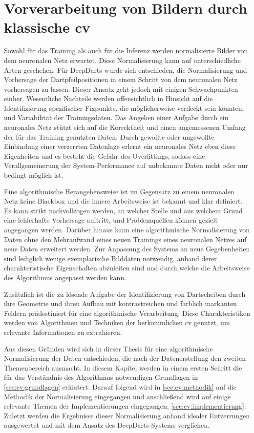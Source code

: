 
\chapter{Vorverarbeitung von Bildern durch klassische \acl{cv}}
\label{cha:cv}

Sowohl für das Training als auch für die Inferenz werden normalisierte Bilder von dem neuronalen Netz erwartet. Diese Normalisierung kann auf unterschiedliche Arten geschehen. Für DeepDarts wurde sich entschieden, die Normalisierung und Vorhersage der Dartpfeilpositionen in einem Schritt von dem neuronalen Netz vorhersagen zu lassen. Dieser Ansatz geht jedoch mit einigen Schwachpunkten einher. Wesentliche Nachteile werden offensichtlich in Hinsicht auf die Identifizierung spezifischer Fixpunkte, die möglicherweise verdeckt sein könnten, und Variabilität der Trainingsdaten. Das Angehen einer Aufgabe durch ein neuronales Netz stützt sich auf die Korrektheit und einen angemessenen Umfang der für das Training genutzten Daten. Durch gewollte oder ungewollte Einbindung einer verzerrten Datenlage erlernt ein neuronales Netz eben diese Eigenheiten und es besteht die Gefahr des Overfittings, sodass eine Verallgemeinerung der System-Performance auf unbekannte Daten nicht oder nur bedingt möglich ist.

Eine algorithmische Herangehensweise ist im Gegensatz zu einem neuronalen Netz keine Blackbox und die innere Arbeitsweise ist bekannt und klar definiert. Es kann strikt nachvollzogen werden, an welcher Stelle und aus welchem Grund eine fehlerhafte Vorhersage auftritt, und Problemquellen können gezielt angegangen werden. Darüber hinaus kann eine algorithmische Normalisierung von Daten ohne den Mehraufwand eines neuen Trainings eines neuronalen Netzes auf neue Daten erweitert werden. Zur Anpassung des Systems an neue Gegebenheiten sind lediglich wenige exemplarische Bilddaten notwendig, anhand derer charakteristische Eigenschaften abzuleiten sind und durch welche die Arbeitsweise des Algorithmus angepasst werden kann.

Zusätzlich ist die zu lösende Aufgabe der Identifizierung von Dartscheiben durch ihre Geometrie und ihren Aufbau mit kontrastreichen und farblich markanten Feldern prädestiniert für eine algorithmische Verarbeitung. Diese Charakteristiken werden von Algorithmen und Techniken der herkömmlichen \ac{cv} genutzt, um relevante Informationen zu extrahieren.

Aus diesen Gründen wird sich in dieser Thesis für eine algorithmische Normalisierung der Daten entschieden, die nach der Datenerstellung den zweiten Themenbereich ausmacht. In diesem Kapitel werden in einem ersten Schritt die für das Verständnis des Algorithmus notwendigen Grundlagen in \autoref{sec:cv:grundlagen} erläutert. Darauf folgend wird in \autoref{sec:cv:methodik} auf die Methodik der Normalisierung eingegangen und anschließend wird auf einige relevante Themen der Implementierungen eingegangen; \autoref{sec:cv:implementierung}. Zuletzt werden die Ergebnisse dieser Normalisierung anhand idealer Entzerrungen ausgewertet und mit dem Ansatz des DeepDarts-Systems verglichen.





